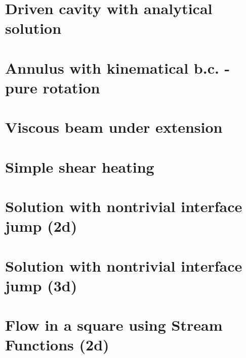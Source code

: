 \section{Driven cavity with analytical solution \label{sec:ldc_anal}}


\section{Annulus with kinematical b.c. - pure rotation} \label{ss:ankbc}


\section{Viscous beam under extension \label{ss:viscousbeamext}}


\section{Simple shear heating} \label{ss:shearheating} 


\section{Solution with nontrivial interface jump (2d)} \label{ss:jump2D} 


\section{Solution with nontrivial interface jump (3d)} \label{ss:jump3D} 


\section{Flow in a square using Stream Functions (2d) \label{ss:square_streamfct} }


